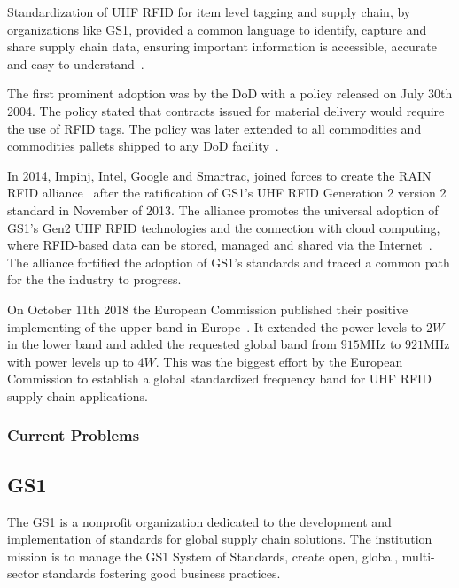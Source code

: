 Standardization of \gls{UHF RFID} for item level tagging and \gls{supply chain}, by organizations like \gls{GS1}, provided a common language to identify, capture and share supply chain data, ensuring important information is accessible, accurate and easy to understand~\cite{anonymousStandardsGS12014}.

The first prominent adoption was by the \gls{DoD} with a policy released on July 30th 2004. The policy stated that contracts issued for material delivery would require the use of RFID tags. The policy was later extended to all commodities and commodities pallets shipped to any \gls{DoD} facility~\cite{DoDSuppliersPassive, DODReleasesFinal}.

In 2014, Impinj, Intel, Google and Smartrac, joined forces to create the \gls{RAIN RFID} alliance~\cite{TechnologyCompaniesCreate} after the ratification of \gls{GS1}'s \gls{UHF RFID} Generation 2 version 2 standard in November of 2013. The alliance promotes the universal adoption of \gls{GS1}'s Gen2 \gls{UHF RFID} technologies and the connection with \gls{cloud computing}, where RFID-based data can be stored, managed and shared via the Internet~\cite{WhatRAINRFID}.
The alliance fortified the adoption of \gls{GS1}'s standards and traced a common path for the the industry to progress.

On October 11th 2018 the European Commission published their positive implementing of the upper band in Europe~\cite{302208v030101pPdf}.
It extended the power levels to $2W$ in the lower band and added the requested global band from $915$MHz to $921$MHz with power levels up to $4W$. 
This was the biggest effort by the European Commission to establish a global standardized frequency band for \gls{UHF RFID} \gls{supply chain} applications.

\subsubsection{Current Problems}


\subsection{GS1}

The GS1 is a nonprofit organization dedicated to the development and implementation of standards for global \gls{supply chain} solutions. 
The institution mission is to manage the GS1 System of Standards, create open, global, multi-sector standards fostering good business practices.

